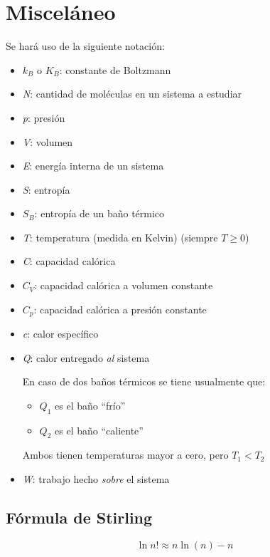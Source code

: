 
\section{Misceláneo}

Se hará uso de la siguiente notación:
	\begin{itemize}
	    \item $k_B$ o $K_B$: constante de Boltzmann
	    \item \textit{N}: cantidad de moléculas en un sistema a estudiar
	    \item \textit{p}: presión
	    \item \textit{V}: volumen
	    \item \textit{E}: energía interna de un sistema
	    \item \textit{S}: entropía
	    \item $S_B$: entropía de un baño térmico
	    \item \textit{T}: temperatura (medida en Kelvin) (siempre $ T \geq 0$)
	    \item \textit{C}: capacidad calórica
	    \item $C_V$: capacidad calórica a volumen constante
	    \item $C_p$: capacidad calórica a presión constante
	    \item \textit{c}: calor específico
	    \item \textit{Q}: calor entregado \textit{al} sistema
	    
	    En caso de dos baños térmicos se tiene usualmente que:
	    \begin{itemize}
	        \item $Q_1$ es el baño \enquote{frío} 
	        \item $Q_2$ es el baño \enquote{caliente}
	    \end{itemize}
	    Ambos tienen temperaturas mayor a cero, pero $T_1 < T_2$
	    
	    \item \textit{W}: trabajo hecho \textit{sobre} el sistema
	\end{itemize}

\subsection{Fórmula de Stirling}

\[\ln n! \approx n\ln ( n )- n\]

